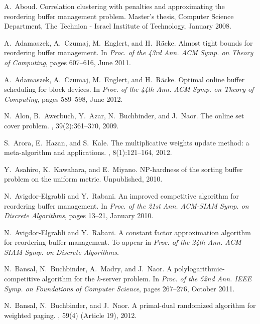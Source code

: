 \documentclass[12pt]{article}
\begin{document}

\begin{thebibliography}{10}


A.~Aboud.
\newblock Correlation clustering with penalties and approximating the
  reordering buffer management problem.
\newblock Master's thesis, Computer Science Department, The {Technion} -
  {Israel} Institute of Technology, January 2008.

A.~Adamaszek, A.~Czumaj, M.~Englert, and H.~R\"acke.
\newblock Almost tight bounds for reordering buffer management.
\newblock In {\em Proc. of the 43rd Ann. ACM Symp. on Theory of Computing},
  pages 607--616, June 2011.

A.~Adamaszek, A.~Czumaj, M.~Englert, and H.~R\"acke.
\newblock Optimal online buffer scheduling for block devices.
\newblock In {\em Proc. of the 44th Ann. ACM Symp. on Theory of Computing},
 pages 589--598, June 2012.



N.~Alon, B.~Awerbuch, Y.~Azar, N.~Buchbinder, and J.~Naor.
\newblock The online set cover problem.
, 39(2):361--370, 2009.

S.~Arora, E.~Hazan, and S.~Kale.
\newblock The multiplicative weights update method: a meta-algorithm and applications.
, 8(1):121--164, 2012.

Y.~Asahiro, K.~Kawahara, and E.~Miyano.
\newblock NP-hardness of the sorting buffer problem on the uniform metric.
\newblock Unpublished, 2010.

N.~Avigdor-Elgrabli and Y.~Rabani.
\newblock An improved competitive algorithm for reordering buffer management.
\newblock In {\em Proc. of the 21st Ann. ACM-SIAM Symp. on Discrete Algorithms},
  pages 13--21, January 2010.

N.~Avigdor-Elgrabli and Y.~Rabani.
\newblock A constant factor approximation algorithm for reordering buffer management.
\newblock To appear in {\em Proc. of the 24th Ann. ACM-SIAM Symp. on Discrete Algorithms}.



N.~Bansal, N.~Buchbinder, A.~Madry, and J.~Naor.
\newblock A polylogarithmic-competitive algorithm for the $k$-server problem.
\newblock In {\em Proc. of the 52nd Ann. IEEE Symp. on Foundations of Computer Science},
pages 267--276, October 2011.

N.~Bansal, N.~Buchbinder, and J.~Naor.
\newblock A primal-dual randomized algorithm for weighted paging.
, 59(4) (Article 19), 2012.


\end{thebibliography}
\end{document}
